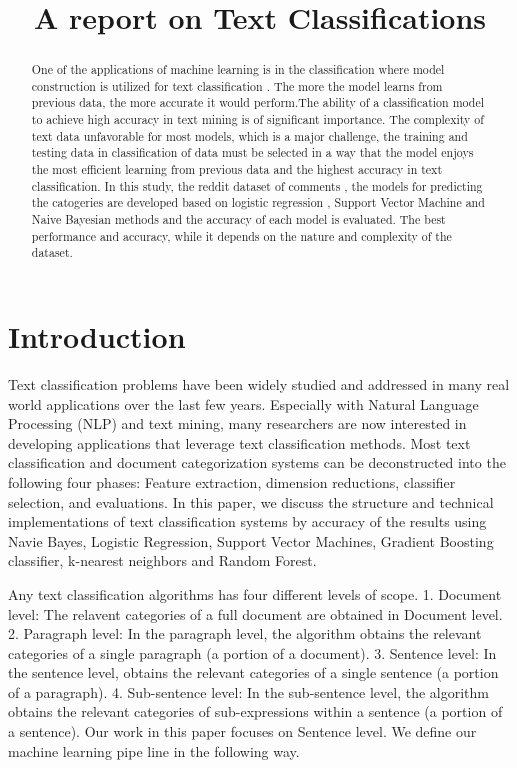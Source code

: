\documentclass[conference]{IEEEtran}
\begin{document}
\title{
A report on Text Classifications
}

\author{
	}

\maketitle
\begin{abstract}
One of the applications of machine learning is in the
classification where model construction is utilized for
text classification . The more the model learns from previous
data, the more accurate it would perform.The ability of a
classification model to achieve high accuracy in text mining 
is of significant importance. The complexity of text data
unfavorable for most models, which is a major challenge, the
training and testing data in classification of data must be selected
in a way that the model enjoys the most efficient learning from
previous data and the highest accuracy in text classification.
In this study, the reddit dataset of comments , the models
for predicting the catogeries  are developed based on
logistic regression , Support Vector Machine and Naive Bayesian methods and the accuracy of each model is evaluated. The best performance and accuracy, while it depends
on the nature and complexity of the dataset.
\end{abstract}
\section{Introduction}


Text classification problems have been widely studied and addressed in many real world applications
over the last few years. Especially with Natural Language Processing
(NLP) and text mining, many researchers are now interested in developing applications that leverage
text classification methods. Most text classification and document categorization systems can be
deconstructed into the following four phases: Feature extraction, dimension reductions, classifier
selection, and evaluations. In this paper, we discuss the structure and technical implementations of text classification systems by accuracy of the results using Navie Bayes, Logistic Regression, 
Support Vector Machines, Gradient Boosting classifier, k-nearest neighbors and Random Forest.

Any text classification algorithms has four different levels of scope.
1. Document level: The relavent categories of a full document are obtained in Document level.
2. Paragraph level: In the paragraph level, the algorithm obtains the relevant categories of a single
paragraph (a portion of a document).
3. Sentence level: In the sentence level, obtains the relevant categories of a single sentence (a portion
of a paragraph).
4. Sub-sentence level: In the sub-sentence level, the algorithm obtains the relevant categories of
sub-expressions within a sentence (a portion of a sentence). Our work in this paper focuses on Sentence level. 
We define our machine learning pipe line in the following way.
\end{document}
